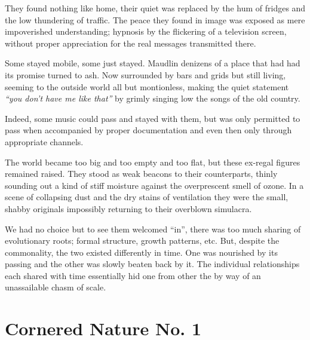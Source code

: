 \documentclass{book}
\begin{document}
They found nothing like home, their quiet was replaced by the hum of fridges
and the low thundering of traffic. The peace they found in image was exposed as
mere impoverished understanding; hypnosis by the flickering of a television
screen, without proper appreciation for the real messages transmitted there.

Some stayed mobile, some just stayed. Maudlin denizens of a place that had had
its promise turned to ash. Now surrounded by bars and grids but still living,
seeming to the outside world all but montionless, making the quiet statement
\emph{``you don't have me like that''} by grimly singing low the songs of the
old country.

Indeed, some music could pass and stayed with them, but was only permitted to
pass when accompanied by proper documentation and even then only through
appropriate channels.

The world became too big and too empty and too flat, but these ex-regal figures
remained raised. They stood as weak beacons to their counterparts, thinly
sounding out a kind of stiff moisture against the overprescent smell of ozone.
In a scene of collapsing dust and the dry stains of ventilation they were the
small, shabby originals impossibly returning to their overblown simulacra.

We had no choice but to see them welcomed ``in'', there was too much sharing of
evolutionary roots; formal structure, growth patterns, etc. But, despite the
commonality, the two existed differently in time. One was nourished by its
passing and the other was slowly beaten back by it. The individual
relationships each shared with time essentially hid one from other the by way
of an unassailable chasm of scale.

\chapter{Cornered Nature No. 1}
\label{chapter:cornered-nature-1}
\end{document}
